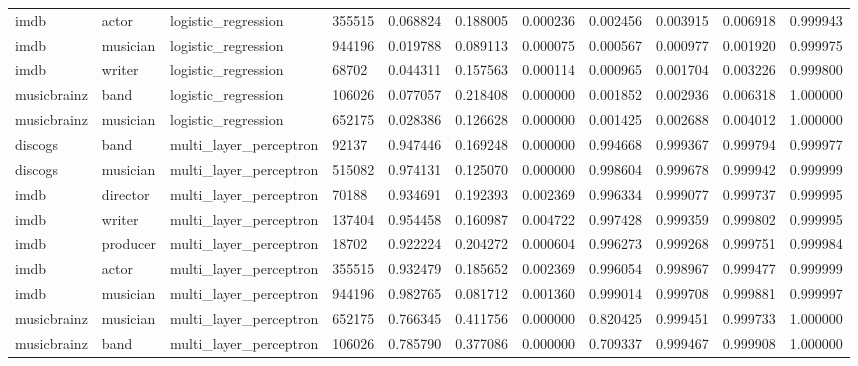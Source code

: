 \documentclass[epsfig,a4paper,11pt,titlepage,twoside,openany]{book}
\begin{document}
\begin{longtable}{|l|l|l|l|l|l|l|l|l|l|l|}
imdb        & actor    & logistic\_regression              & 355515 & 0.068824 & 0.188005 & 0.000236 & 0.002456 & 0.003915 & 0.006918 & 0.999943 \\
imdb        & musician & logistic\_regression              & 944196 & 0.019788 & 0.089113 & 0.000075 & 0.000567 & 0.000977 & 0.001920 & 0.999975 \\
imdb        & writer   & logistic\_regression              & 68702  & 0.044311 & 0.157563 & 0.000114 & 0.000965 & 0.001704 & 0.003226 & 0.999800 \\
musicbrainz & band     & logistic\_regression              & 106026 & 0.077057 & 0.218408 & 0.000000 & 0.001852 & 0.002936 & 0.006318 & 1.000000 \\
musicbrainz & musician & logistic\_regression              & 652175 & 0.028386 & 0.126628 & 0.000000 & 0.001425 & 0.002688 & 0.004012 & 1.000000 \\ \hline
discogs     & band     & multi\_layer\_perceptron          & 92137  & 0.947446 & 0.169248 & 0.000000 & 0.994668 & 0.999367 & 0.999794 & 0.999977 \\
discogs     & musician & multi\_layer\_perceptron          & 515082 & 0.974131 & 0.125070 & 0.000000 & 0.998604 & 0.999678 & 0.999942 & 0.999999 \\
imdb        & director & multi\_layer\_perceptron          & 70188  & 0.934691 & 0.192393 & 0.002369 & 0.996334 & 0.999077 & 0.999737 & 0.999995 \\
imdb        & writer   & multi\_layer\_perceptron          & 137404 & 0.954458 & 0.160987 & 0.004722 & 0.997428 & 0.999359 & 0.999802 & 0.999995 \\
imdb        & producer & multi\_layer\_perceptron          & 18702  & 0.922224 & 0.204272 & 0.000604 & 0.996273 & 0.999268 & 0.999751 & 0.999984 \\
imdb        & actor    & multi\_layer\_perceptron          & 355515 & 0.932479 & 0.185652 & 0.002369 & 0.996054 & 0.998967 & 0.999477 & 0.999999 \\
imdb        & musician & multi\_layer\_perceptron          & 944196 & 0.982765 & 0.081712 & 0.001360 & 0.999014 & 0.999708 & 0.999881 & 0.999997 \\
musicbrainz & musician & multi\_layer\_perceptron          & 652175 & 0.766345 & 0.411756 & 0.000000 & 0.820425 & 0.999451 & 0.999733 & 1.000000 \\
musicbrainz & band     & multi\_layer\_perceptron          & 106026 & 0.785790 & 0.377086 & 0.000000 & 0.709337 & 0.999467 & 0.999908 & 1.000000 \\ \hline

\end{longtable}
\end{document}
